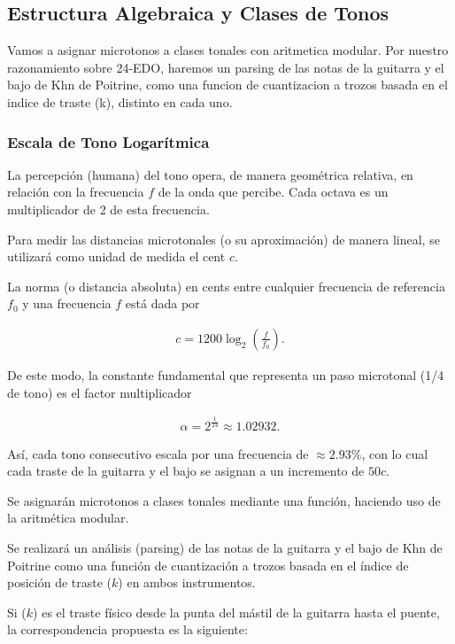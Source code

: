 \documentclass[11pt, a4paper]{article}
\begin{document}
\subsection*{Estructura Algebraica y Clases de Tonos}

Vamos a asignar microtonos a clases tonales con aritmetica modular. Por nuestro razonamiento sobre 24-EDO, haremos un parsing de las notas de la guitarra y el bajo de Khn de Poitrine, como una funcion de cuantizacion a trozos basada en el indice de traste (k), distinto en cada uno.

\subsubsection*{Escala de Tono Logarítmica}

La percepción (humana) del tono opera, de manera geométrica relativa, en relación con la frecuencia $f$ de la onda que percibe. Cada octava es un multiplicador de 2 de esta frecuencia.

Para medir las distancias microtonales (o su aproximación) de manera lineal, se utilizará como unidad de medida el cent $c$.

La norma (o distancia absoluta) en cents entre cualquier frecuencia de referencia $f_0$ y una frecuencia $f$ está dada por

\begin{align*}
c = 1200 \log_2 \left( \frac{f}{f_0} \right).
\end{align*}

De este modo, la constante fundamental que representa un paso microtonal (1/4 de tono) es el factor multiplicador

\begin{align*}
\alpha = 2^{\frac{1}{24}} \approx 1.02932.
\end{align*}

Así, cada tono consecutivo escala por una frecuencia de $\approx 2.93\%$, con lo cual cada traste de la guitarra y el bajo se asignan a un incremento de $50c$.

Se asignarán microtonos a clases tonales mediante una función, haciendo uso de la aritmética modular.

Se realizará un análisis (parsing) de las notas de la guitarra y el bajo de Khn de Poitrine como una función de cuantización a trozos basada en el índice de posición de traste ($k$) en ambos instrumentos.

Si ($k$) es el traste físico desde la punta del mástil de la guitarra hasta el puente, la correspondencia propuesta es la siguiente:
\end{document}
